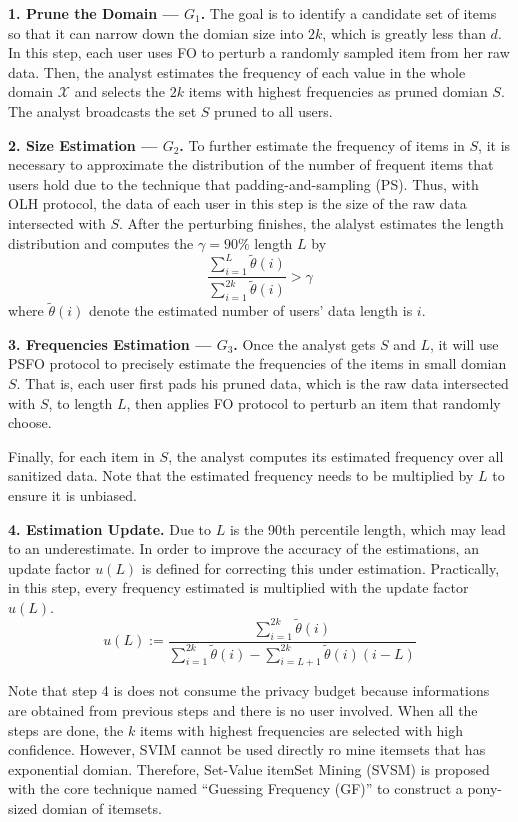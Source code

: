 \documentclass[conference]{IEEEtran}
\begin{document}
\textbf{1. Prune the Domain --- $G_1$.} The goal is to identify a candidate set of items so that it can narrow down the domian size into $2k$, which is greatly less than $d$. In this step, each user uses FO to perturb a randomly sampled item from her raw data. Then, the analyst estimates the frequency of each value in the whole domain $\mathcal{X}$ and selects the $2k$ items with highest frequencies as pruned domian $S$. The analyst broadcasts the set $S$ pruned to all users.

\textbf{2. Size Estimation --- $G_2$.} To further estimate the frequency of items in $S$, it is necessary to approximate the distribution of the number of frequent items that users hold due to the technique that padding-and-sampling (PS). Thus, with OLH protocol, the data of each user in this step is the size of the raw data intersected with $S$. After the perturbing finishes, the alalyst estimates the length distribution and computes the $\gamma = 90\%$ length $L$ by  
\begin{equation}
\frac{\sum_{i=1}^{L} \tilde{\theta}(i)}{\sum_{i=1}^{2k} \tilde{\theta}(i)} > \gamma \label{length}
\end{equation}
where $\tilde{\theta}(i)$ denote the estimated number of users' data length is $i$. 

\textbf{3. Frequencies Estimation --- $G_3$.} Once the analyst gets $S$ and $L$, it will use PSFO protocol to precisely estimate the frequencies of the items in small domian $S$. That is, each user first pads his pruned data, which is the raw data intersected with $S$, to length $L$, then applies FO protocol to perturb an item that randomly choose. 

Finally, for each item in $S$, the analyst computes its estimated frequency over all sanitized data. Note that the estimated frequency needs to be multiplied by $L$ to ensure it is unbiased.

\textbf{4. Estimation Update.} Due to $L$ is the 90th percentile length, which may lead to an underestimate. In order to improve the accuracy of the estimations, an update factor $u(L)$ is defined for correcting this under estimation. Practically, in this step, every frequency estimated is multiplied with the update factor $u(L)$.
$$u(L) := \frac{\sum_{i=1}^{2k} \tilde{\theta}(i)}{\sum_{i=1}^{2k} \tilde{\theta}(i) - \sum_{i=L+1}^{2k} \tilde{\theta}(i)(i-L) }$$

Note that step 4 is does not consume the privacy budget because informations are obtained from previous steps and there is no user involved. When all the steps are done, the $k$ items with highest frequencies are selected with high confidence. However, SVIM cannot be used directly ro mine itemsets that has exponential domian. Therefore, Set-Value itemSet Mining (SVSM) is proposed with the core technique named ``Guessing Frequency (GF)'' to construct a pony-sized domian of itemsets.
\end{document}
